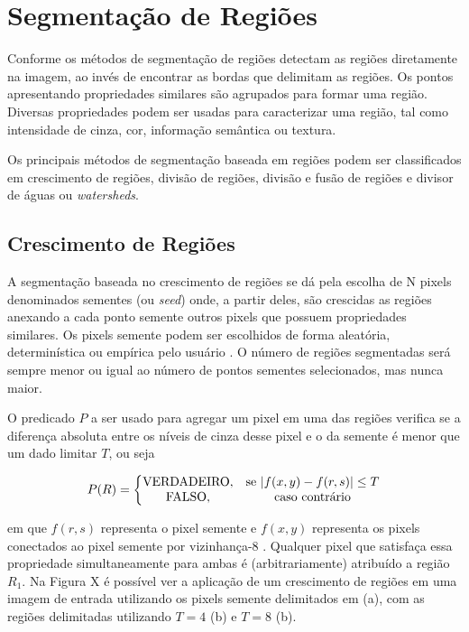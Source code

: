 \documentclass[12pt,oneside,a4paper,english,french,spanish,brazil,]{abntex2}
\begin{document}
\section{Segmentação de Regiões}
Conforme \cite{pedrini:2008} os métodos de segmentação de regiões detectam as regiões diretamente na imagem, ao invés de encontrar as bordas que delimitam as regiões. Os pontos apresentando propriedades similares são agrupados para formar uma região. Diversas propriedades podem ser usadas para caracterizar uma região, tal como intensidade de cinza, cor, informação semântica ou textura.

Os principais métodos de segmentação baseada em regiões podem ser classificados em crescimento de regiões, divisão de regiões, divisão e fusão de regiões e divisor de águas ou \textit{watersheds}.

\subsection{Crescimento de Regiões}

A segmentação baseada no crescimento de regiões se dá pela escolha de N pixels denominados sementes (ou \textit{seed}) onde, a partir deles, são crescidas as regiões anexando a cada ponto semente outros pixels que possuem propriedades similares. Os pixels semente podem ser escolhidos de forma aleatória, determinística ou empírica pelo usuário \cite{pedrini:2008}. O número de regiões segmentadas será sempre menor ou igual ao número de pontos sementes selecionados, mas nunca maior.

O predicado \(P\) a ser usado para agregar um pixel em uma das regiões verifica se a diferença absoluta entre os níveis de cinza desse pixel e o da semente é menor que um dado limitar \(T\), ou seja

\[P(R) = \left\{\begin{matrix}
\textup{VERDADEIRO}, & \textup{se }|f(x,y) - f(r,s)| \leq T\\ 
\textup{FALSO}, & \textup{caso contrário}
\end{matrix}\right.\]

em que \(f(r,s)\) representa o pixel semente e \(f(x,y)\) representa os pixels conectados ao pixel semente por vizinhança-8 \cite{pedrini:2008}. Qualquer pixel que satisfaça essa propriedade simultaneamente para ambas é (arbitrariamente) atribuído a região \(R_1\). Na Figura X é possível ver a aplicação de um crescimento de regiões em uma imagem de entrada utilizando os pixels semente delimitados em (a), com as regiões delimitadas utilizando \(T=4\) (b) e \(T=8\) (b).
\end{document}
